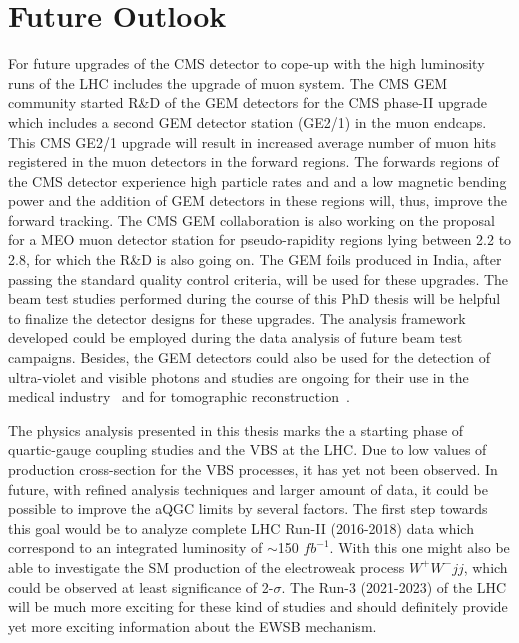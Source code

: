 \section{Future Outlook} %
\label{sec:future_outlook}
For future upgrades of the CMS detector to cope-up with the high luminosity runs of the LHC includes the upgrade of muon system. The CMS GEM community started R\&D of the GEM detectors for the CMS phase-II upgrade which  includes a  second GEM detector station (GE2/1) in the muon endcaps. This CMS GE2/1 upgrade will result  in increased  average number of muon hits registered in the muon detectors in the forward regions. The forwards regions of the CMS detector experience  high particle rates and and a low magnetic bending power and the addition of GEM detectors in these regions will, thus, improve the forward tracking. 
The CMS GEM collaboration is also working on the proposal for a MEO muon detector station for pseudo-rapidity regions lying between 2.2 to 2.8, for which the R\&D is also going on. 
The GEM foils produced in India, after passing the standard quality control criteria, will be used for these upgrades. The beam test studies performed during the course of this PhD thesis will be helpful to finalize the detector designs for these upgrades. The analysis framework developed could be employed during the data analysis of future beam test campaigns.  
Besides, the GEM detectors could also be used for the detection of ultra-violet and visible photons and studies are ongoing for their use in the medical industry~\cite{Wallmark2001,Tsyganov2008,Remillard2000} and for tomographic reconstruction~\cite{Gnanvo2010}. 

The physics analysis presented in this thesis marks the a starting phase of quartic-gauge coupling studies and the VBS at the LHC. Due to low values of production cross-section for the VBS processes, it has yet not been observed. In future, with refined analysis techniques and larger amount of data, it could be possible to improve the aQGC limits by several factors. The first step towards this goal would be to analyze complete LHC Run-II (2016-2018) data which correspond to an integrated luminosity of $\sim$150 $fb^{-1}$.
With this one might also be able to investigate the SM production of the electroweak process $W^+W^-jj$, which could be observed at least significance of 2-$\sigma$.
The Run-3 (2021-2023) of the LHC will be much more exciting for these kind of studies and should definitely provide yet more exciting information about the EWSB mechanism.

